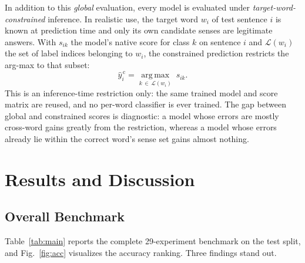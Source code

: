 \documentclass[conference]{IEEEtran}
\begin{document}
In addition to this \emph{global} evaluation, every model is evaluated under \emph{target-word-constrained} inference. In realistic use, the target word $w_i$ of test sentence $i$ is known at prediction time and only its own candidate senses are legitimate answers. With $s_{ik}$ the model's native score for class $k$ on sentence $i$ and $\mathcal{L}(w_i)$ the set of label indices belonging to $w_i$, the constrained prediction restricts the arg-max to that subset:
\begin{equation}
\hat{y}_i^{\,\mathrm{c}} = \operatorname*{arg\,max}_{k \,\in\, \mathcal{L}(w_i)} \; s_{ik}.
\label{eq:constrained}
\end{equation}
This is an inference-time restriction only: the same trained model and score matrix are reused, and no per-word classifier is ever trained. The gap between global and constrained scores is diagnostic: a model whose errors are mostly cross-word gains greatly from the restriction, whereas a model whose errors already lie within the correct word's sense set gains almost nothing.

\section{Results and Discussion}
\subsection{Overall Benchmark}
Table~\ref{tab:main} reports the complete 29-experiment benchmark on the test split, and Fig.~\ref{fig:acc} visualizes the accuracy ranking. Three findings stand out.
\end{document}
